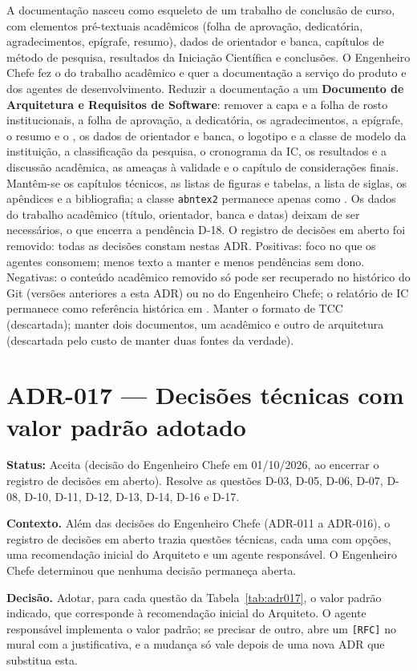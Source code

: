 {A documentação nasceu como esqueleto de um trabalho de conclusão de curso, com elementos pré-textuais acadêmicos (folha de aprovação, dedicatória, agradecimentos, epígrafe, resumo), dados de orientador e banca, capítulos de método de pesquisa, resultados da Iniciação Científica e conclusões. O Engenheiro Chefe fez o  do trabalho acadêmico e quer a documentação a serviço do produto e dos agentes de desenvolvimento.}
{Reduzir a documentação a um \textbf{Documento de Arquitetura e Requisitos de Software}: remover a capa e a folha de rosto institucionais, a folha de aprovação, a dedicatória, os agradecimentos, a epígrafe, o resumo e o , os dados de orientador e banca, o logotipo e a classe de modelo da instituição, a classificação da pesquisa, o cronograma da IC, os resultados e a discussão acadêmica, as ameaças à validade e o capítulo de considerações finais. Mantêm-se os capítulos técnicos, as listas de figuras e tabelas, a lista de siglas, os apêndices e a bibliografia; a classe \texttt{abntex2} permanece apenas como . Os dados do trabalho acadêmico (título, orientador, banca e datas) deixam de ser necessários, o que encerra a pendência D-18. O registro de decisões em aberto foi removido: todas as decisões constam nestas ADR.}
{Positivas: foco no que os agentes consomem; menos texto a manter e menos pendências sem dono. Negativas: o conteúdo acadêmico removido só pode ser recuperado no histórico do Git (versões anteriores a esta ADR) ou no  do Engenheiro Chefe; o relatório de IC permanece como referência histórica em .}
{Manter o formato de TCC (descartada); manter dois documentos, um acadêmico e outro de arquitetura (descartada pelo custo de manter duas fontes da verdade).}

\section{ADR-017 --- Decisões técnicas com valor padrão adotado}\hypertarget{adr:ADR-017}{}
\noindent\textbf{Status:} Aceita (decisão do Engenheiro Chefe em 01/10/2026, ao encerrar o registro de decisões em aberto). Resolve as questões D-03, D-05, D-06, D-07, D-08, D-10, D-11, D-12, D-13, D-14, D-16 e D-17.\par\smallskip
\noindent\textbf{Contexto.} Além das decisões do Engenheiro Chefe (ADR-011 a ADR-016), o registro de decisões em aberto trazia questões técnicas, cada uma com opções, uma recomendação inicial do Arquiteto e um agente responsável. O Engenheiro Chefe determinou que nenhuma decisão permaneça aberta.\par\smallskip
\noindent\textbf{Decisão.} Adotar, para cada questão da Tabela~\ref{tab:adr017}, o valor padrão indicado, que corresponde à recomendação inicial do Arquiteto. O agente responsável implementa o valor padrão; se precisar de outro, abre um \texttt{[RFC]} no mural com a justificativa, e a mudança só vale depois de uma nova ADR que substitua esta.\par\medskip

